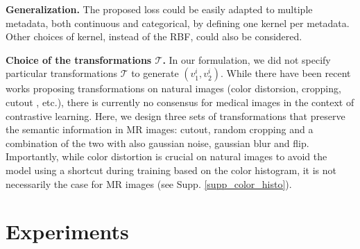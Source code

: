 \documentclass[runningheads]{llncs}
\begin{document}
\textbf{Generalization.} The proposed loss could be easily adapted to multiple metadata, both continuous and categorical, by defining one kernel per metadata. Other choices of kernel, instead of the RBF, could also be considered.



\textbf{Choice of the transformations $\mathcal{T}$.}
In our formulation, we did not specify particular transformations $\mathcal{T}$ to generate $(v_1^i, v_2^i)$. While there have been recent works \cite{chen2019self_supervision, tian2020} proposing transformations on natural images (color distorsion, cropping, cutout \cite{devries2017cutout}, etc.), there is currently no consensus for medical images in the context of contrastive learning. Here, we design three sets of transformations that preserve the semantic information in MR images: cutout, random cropping and a combination of the two with also gaussian noise, gaussian blur and flip. Importantly, while color distortion is crucial on natural images \cite{chen2020simCLR} to avoid the model using a shortcut during training based on the color histogram, it is not necessarily the case for MR images (see Supp. \ref{supp_color_histo}). 


\section{Experiments}
\end{document}
